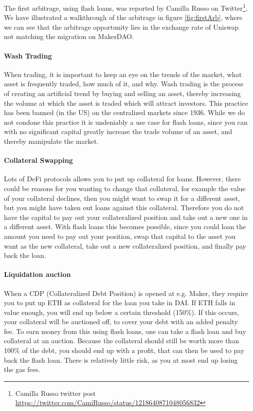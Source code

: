 The first arbitrage, using flash loans, was reported by Camilla Russo
on Twitter\footnote{Camilla Russo twitter post
  \url{https://twitter.com/CamiRusso/status/1218640871048056832}}. We
have illustrated a walkthrough of the arbitrage in figure
\ref{fig:firstArb}, where we can see that the arbitrage opportunity
lies in the exchange rate of Uniswap not matching the migration on
MakerDAO.

\paragraph{Wash Trading} When trading, it is important to keep an eye
on the trends of the market, what asset is frequently traded, how much
of it, and why. Wash trading is the process of creating an artificial
trend by buying and selling an asset, thereby increasing the volume at
which the asset is traded which will attract investors. This practice
has been banned (in the US) on the centralized markets since
1936. While we do not condone this practice it is undeniably a use case for
flash loans, since you can with no significant capital greatly increase the
trade volume of an asset, and thereby manipulate the market.

\paragraph{Collateral Swapping} Lots of DeFi protocols allows you to
put up collateral for loans. However, there could be reasons for you
wanting to change that collateral, for example the value of your collateral
declines, then you might want to swap it for a different asset, but you might
have taken out loans against this collateral. Therefore you do not have the
capital to pay out your collateralized position and take out a new one in a
different asset. With flash loans this becomes possible, since you could loan
the amount you need to pay out your position, swap that capital to the asset you
want as the new collateral, take out a new collateralized position, and finally
pay back the loan. 

\paragraph{Liquidation auction} When a CDP (Collateralized Debt Position) is
opened at e.g. Maker, they require you to put up ETH as collateral for the loan
you take in DAI. If ETH falls in value enough, you will end up below a certain
threshold (150\%). If this occurs, your collateral will be auctioned off, to
cover your debt with an added penalty fee. To earn money from this
using flash loans, one can take a flash loan and buy collateral at an auction.
Because the collateral should still be worth more than 100\% of the debt, you
should end up with a profit, that can then be used to pay back the flash loan.
There is relatively little risk, as you at most end up losing the gas fees.
